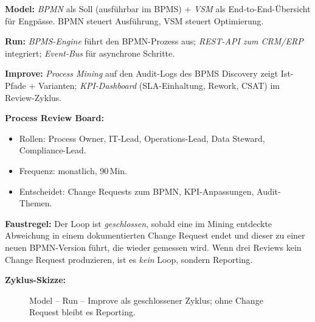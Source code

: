 \documentclass[11pt,a4paper,oneside]{article}
\begin{document}
\begin{loesungbox}
\textbf{Model:} \emph{BPMN} als Soll (ausf\"uhrbar im BPMS) + \emph{VSM} als End-to-End-\"Ubersicht f\"ur Engp\"asse. BPMN steuert Ausf\"uhrung, VSM steuert Optimierung.

\smallskip
\textbf{Run:} \emph{BPMS-Engine} f\"uhrt den BPMN-Prozess aus; \emph{REST-API zum CRM/ERP} integriert; \emph{Event-Bus} f\"ur asynchrone Schritte.

\smallskip
\textbf{Improve:} \emph{Process Mining} auf den Audit-Logs des BPMS \textrightarrow{} Discovery zeigt Ist-Pfade + Varianten; \emph{KPI-Dashboard} (SLA-Einhaltung, Rework, CSAT) im Review-Zyklus.

\smallskip
\textbf{Process Review Board:}
\begin{itemize}
  \item Rollen: Process Owner, IT-Lead, Operations-Lead, Data Steward, Compliance-Lead.
  \item Frequenz: monatlich, 90\,Min.
  \item Entscheidet: Change Requests zum BPMN, KPI-Anpassungen, Audit-Themen.
\end{itemize}

\smallskip
\textbf{Faustregel:} Der Loop ist \emph{geschlossen}, sobald eine im Mining entdeckte Abweichung in einem dokumentierten Change Request endet \textendash{} und dieser zu einer neuen BPMN-Version f\"uhrt, die wieder gemessen wird. Wenn drei Reviews kein Change Request produzieren, ist es \emph{kein} Loop, sondern Reporting.

\smallskip
\textbf{Zyklus-Skizze:}

\begin{figure}[h]
\centering
{}
\caption{\sffamily Model -- Run -- Improve als geschlossener Zyklus; ohne Change Request bleibt es Reporting.}
\end{figure}
\end{loesungbox}
\end{document}
